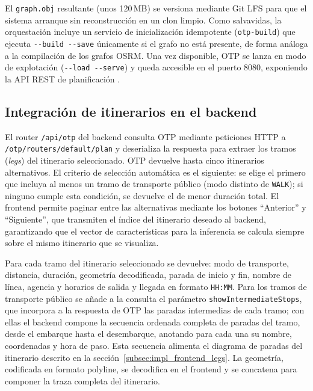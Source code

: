 
El \texttt{graph.obj} resultante (unos 120\,MB) se versiona mediante Git LFS para que el sistema arranque sin reconstrucción en un clon limpio. Como salvavidas, la orquestación incluye un servicio de inicialización idempotente (\texttt{otp-build}) que ejecuta \texttt{-{}-build -{}-save} únicamente si el grafo no está presente, de forma análoga a la compilación de los grafos OSRM. Una vez disponible, OTP se lanza en modo de explotación (\texttt{-{}-load -{}-serve}) y queda accesible en el puerto 8080, exponiendo la API REST de planificación \cite{OTPDocs}.



\subsection{Integración de itinerarios en el backend}
\label{subsec:impl_otp_integracion}

El router \texttt{/api/otp} del backend consulta OTP mediante peticiones HTTP a \texttt{/otp/routers/default/plan} y deserializa la respuesta para extraer los tramos (\textit{legs}) del itinerario seleccionado. OTP devuelve hasta cinco itinerarios alternativos. El criterio de selección automática es el siguiente: se elige el primero que incluya al menos un tramo de transporte público (modo distinto de \texttt{WALK}); si ninguno cumple esta condición, se devuelve el de menor duración total. El frontend permite paginar entre las alternativas mediante los botones ``Anterior'' y ``Siguiente'', que transmiten el índice del itinerario deseado al backend, garantizando que el vector de características para la inferencia se calcula siempre sobre el mismo itinerario que se visualiza.

Para cada tramo del itinerario seleccionado se devuelve: modo de transporte, distancia, duración, geometría decodificada, parada de inicio y fin, nombre de línea, agencia y horarios de salida y llegada en formato \texttt{HH:MM}. Para los tramos de transporte público se añade a la consulta el parámetro \texttt{showIntermediateStops}, que incorpora a la respuesta de OTP las paradas intermedias de cada tramo; con ellas el backend compone la secuencia ordenada completa de paradas del tramo, desde el embarque hasta el desembarque, anotando para cada una su nombre, coordenadas y hora de paso. Esta secuencia alimenta el diagrama de paradas del itinerario descrito en la sección~\ref{subsec:impl_frontend_legs}. La geometría, codificada en formato polyline, se decodifica en el frontend y se concatena para componer la traza completa del itinerario.


